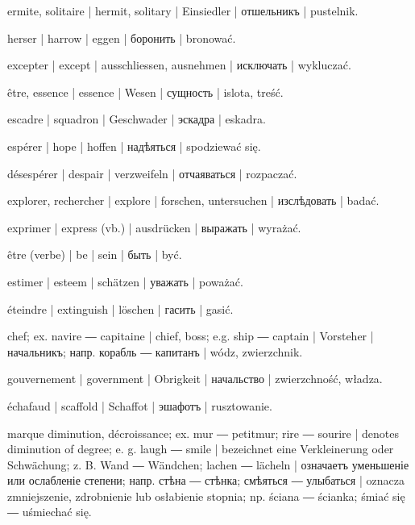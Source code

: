 \begin{outdent}{1em}
ermite, solitaire | hermit, solitary | Einsiedler | отшельникъ | pustelnik.

herser | harrow | eggen | боронить | bronować.

excepter | except | ausschliessen, ausnehmen | исключать | wykluczać.

être, essence | essence | Wesen | сущность | islota, treść.

escadre | squadron | Geschwader | эскадра | eskadra.

espérer | hope | hoffen | надѣяться | spodziewać się.

\uvsubentry{}
désespérer | despair | verzweifeln | отчаяваться | rozpaczać.

explorer, rechercher | explore | forschen, untersuchen | изслѣдовать | badać.

exprimer | express (vb.) | ausdrücken | выражать | wyrażać.

être (verbe) | be | sein | быть | być.

estimer | esteem | schätzen | уважать | poważać.

éteindre | extinguish | löschen | гасить | gasić.

chef; ex.  navire ―  capitaine | chief,
boss; e.g.  ship ―  captain | Vorsteher | начальникъ; напр.  корабль ―  капитанъ | wódz,
zwierzchnik.

\uvsubentry{}
gouvernement | government | Obrigkeit | начальство | zwierzchność, władza.

échafaud | scaffold | Schaffot | эшафотъ | rusztowanie.

marque diminution, décroissance; ex.  mur ― 
petitmur;  rire ―  sourire | denotes diminution of
degree; e. g.  laugh ―  smile | bezeichnet eine Verkleinerung 
oder Schwächung; z. B.  Wand ―  Wändchen; 
lachen ―  lächeln | означаетъ уменьшеніе или ослабленіе
степени; напр.  стѣна ―  стѣнка;  смѣяться ―
 улыбаться | oznacza zmniejszenie, zdrobnienie lub osłabienie
stopnia; np.  ściana ―  ścianka;  śmiać się ―
 uśmiechać się.


\end{outdent}
